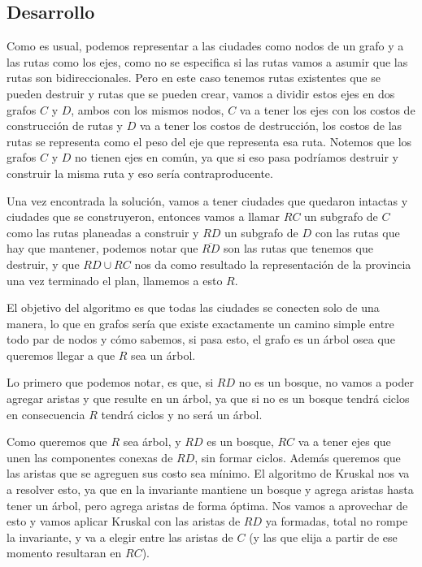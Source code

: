 \subsection{Desarrollo}
Como es usual, podemos representar a las ciudades como nodos de un grafo y a las rutas como los ejes, como no se especifica si las rutas vamos a asumir que las rutas son bidireccionales. Pero en este caso tenemos rutas existentes que se pueden destruir y rutas que se pueden crear, vamos a dividir estos ejes en dos grafos $C$ y $D$, ambos con los mismos nodos, $C$ va a tener los ejes con los costos de construcción de rutas y $D$ va a tener los costos de destrucción, los costos de las rutas se representa como el peso del eje que representa esa ruta. Notemos que los grafos $C$ y $D$ no tienen ejes en común, ya que si eso pasa podríamos destruir y construir la misma ruta y eso sería contraproducente.  
\\
\par
Una vez encontrada la solución, vamos a tener ciudades que quedaron intactas y ciudades que se construyeron, entonces vamos a llamar $RC$ un subgrafo de $C$ como las rutas planeadas a construir y $RD$ un subgrafo de $D$ con las rutas que hay que mantener, podemos notar que $\overline{RD}$ son las rutas que tenemos que destruir, y que $RD \cup RC$ nos da como resultado la representación de la provincia una vez terminado el plan, llamemos a esto $R$. 
\\
\par
El objetivo del algoritmo es que todas las ciudades se conecten solo de una manera, lo que en grafos sería que existe exactamente un camino simple entre todo par de
nodos y cómo sabemos, si pasa esto, el grafo es un árbol osea que queremos llegar a que $R$ sea un árbol. 
\\
\par
Lo primero que podemos notar, es que, si $RD$ no es un bosque, no vamos a poder agregar aristas y que resulte en un árbol, ya que si no es un bosque tendrá ciclos en consecuencia $R$ tendrá ciclos y no será un árbol.
\\
\par
Como queremos que $R$ sea árbol, y $RD$ es un bosque, $RC$ va a tener ejes que unen las componentes conexas de $RD$, sin formar ciclos.  Además queremos que las aristas que se agreguen sus costo sea mínimo. El algoritmo de Kruskal nos va a resolver esto, ya que en la invariante mantiene un bosque y agrega aristas hasta tener un árbol, pero agrega aristas de forma óptima. Nos vamos a aprovechar de esto y vamos aplicar Kruskal con las aristas de $RD$ ya formadas, total no rompe la invariante, y va a elegir entre las aristas de $C$ (y las que elija a partir de ese momento resultaran en $RC$).
